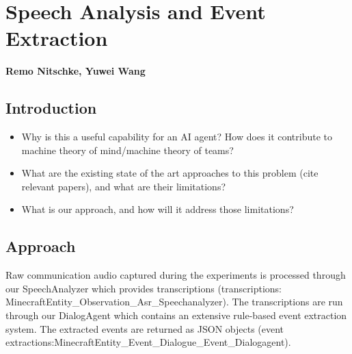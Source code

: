 \chapter{Speech Analysis and Event Extraction}
\textbf{Remo Nitschke, Yuwei Wang}
\section{Introduction}

\begin{itemize}
    \item Why is this a useful capability for an AI
        agent? How does it contribute to machine theory of mind/machine theory
        of teams?
    \item What are the existing state of the art approaches to this problem
        (cite relevant papers), and what are their limitations? 
    \item What is our approach, and how will it address those limitations?
\end{itemize}

\section{Approach}


Raw communication audio captured during the experiments is processed through our SpeechAnalyzer which provides transcriptions (transcriptions: MinecraftEntity_Observation_Asr_Speechanalyzer). The transcriptions are run through our DialogAgent which contains an extensive rule-based event extraction system. The extracted events are returned as JSON objects (event extractions:MinecraftEntity_Event_Dialogue_Event_Dialogagent). 




